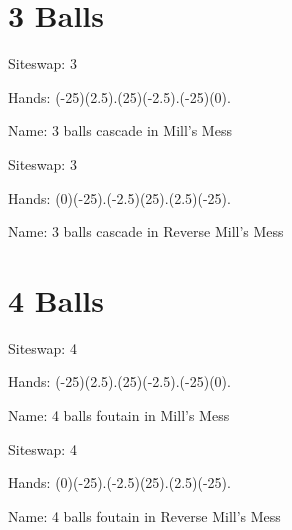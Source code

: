 \documentclass[preview]{standalone}
\begin{document}
\genpage

\section{3 Balls}

\begin{plainhtml}
    Siteswap: 3
\end{plainhtml}
\begin{plainhtml}
    Hands: (-25)(2.5).(25)(-2.5).(-25)(0).
\end{plainhtml}
\begin{plainhtml}
    Name: 3 balls cascade in Mill's Mess
\end{plainhtml}

\begin{plainhtml}
    Siteswap: 3
\end{plainhtml}
\begin{plainhtml}
    Hands: (0)(-25).(-2.5)(25).(2.5)(-25).
\end{plainhtml}
\begin{plainhtml}
    Name: 3 balls cascade in Reverse Mill's Mess
\end{plainhtml}

\section{4 Balls}

\begin{plainhtml}
    Siteswap: 4
\end{plainhtml}
\begin{plainhtml}
    Hands: (-25)(2.5).(25)(-2.5).(-25)(0).
\end{plainhtml}
\begin{plainhtml}
    Name: 4 balls foutain in Mill's Mess
\end{plainhtml}

\begin{plainhtml}
    Siteswap: 4
\end{plainhtml}
\begin{plainhtml}
    Hands: (0)(-25).(-2.5)(25).(2.5)(-25).
\end{plainhtml}
\begin{plainhtml}
    Name: 4 balls foutain in Reverse Mill's Mess
\end{plainhtml}
\end{document}
